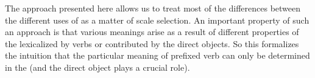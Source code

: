 


The approach presented here allows us to treat most of the differences between the different uses of  as a matter of scale selection. An important property of such an approach is that various meanings arise as a result of different properties of the  lexicalized by verbs or contributed by the direct objects. So this formalizes the intuition that the particular meaning of prefixed verb can only be determined in the  (and the direct object plays a crucial role). 

